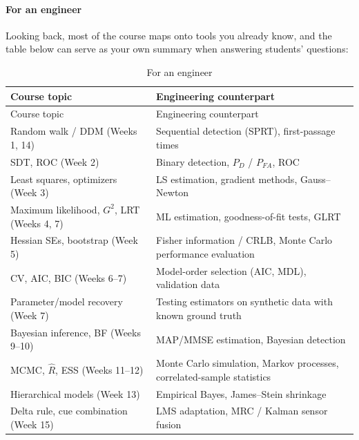 \paragraph{For an engineer}

Looking back, most of the course maps onto tools you already know, and
the table below can serve as your own summary when answering students'
questions:

\begin{longtable}[]{@{}
  >{\raggedright\arraybackslash}p{}
  >{\raggedright\arraybackslash}p{}@{}}
\caption{\centering For an engineer}\tabularnewline
\toprule\noalign{}
\begin{minipage}[b]{\linewidth}\raggedright
Course topic
\end{minipage} & \begin{minipage}[b]{\linewidth}\raggedright
Engineering counterpart
\end{minipage} \\
\midrule\noalign{}
\endfirsthead
\toprule\noalign{}
\begin{minipage}[b]{\linewidth}\raggedright
Course topic
\end{minipage} & \begin{minipage}[b]{\linewidth}\raggedright
Engineering counterpart
\end{minipage} \\
\midrule\noalign{}
\endhead
\bottomrule\noalign{}
\endlastfoot
Random walk / DDM (Weeks 1, 14) & Sequential detection (SPRT),
first-passage times \\
SDT, ROC (Week 2) & Binary detection, \(P_D\) / \(P_{FA}\), ROC \\
Least squares, optimizers (Week 3) & LS estimation, gradient methods,
Gauss--Newton \\
Maximum likelihood, \(G^2\), LRT (Weeks 4, 7) & ML estimation,
goodness-of-fit tests, GLRT \\
Hessian SEs, bootstrap (Week 5) & Fisher information / CRLB, Monte Carlo
performance evaluation \\
CV, AIC, BIC (Weeks 6--7) & Model-order selection (AIC, MDL), validation
data \\
Parameter/model recovery (Week 7) & Testing estimators on synthetic data
with known ground truth \\
Bayesian inference, BF (Weeks 9--10) & MAP/MMSE estimation, Bayesian
detection \\
MCMC, \(\hat R\), ESS (Weeks 11--12) & Monte Carlo simulation, Markov
processes, correlated-sample statistics \\
Hierarchical models (Week 13) & Empirical Bayes, James--Stein
shrinkage \\
Delta rule, cue combination (Week 15) & LMS adaptation, MRC / Kalman
sensor fusion \\
\end{longtable}

